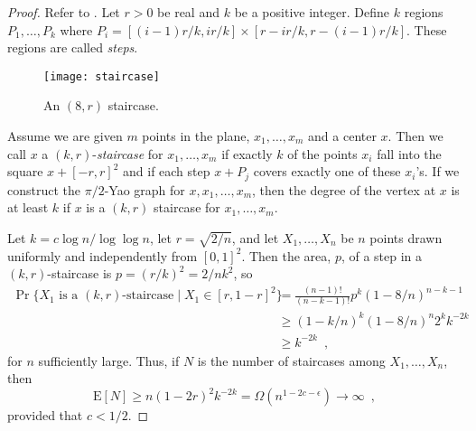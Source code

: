 \documentclass[lotsofwhite,charterfonts]{patmorin}
\newcommand{\EXP}{\mathrm{E}}
\begin{document}
\begin{proof}
Refer to .  Let $r>0$ be real and $k$ be a positive
integer.  Define $k$ regions $P_1,\ldots,P_k$ where $P_i =
[(i-1)r/k,ir/k]\times [r-ir/k,r-(i-1)r/k]$.  These regions are called
\emph{steps}. 

\begin{figure}
  \begin{center}
    \texttt{[image: staircase]}
  \end{center}
  \caption{An $(8,r)$ staircase.}
\end{figure}

Assume we are given $m$ points in the plane, $x_1,\ldots,x_m$ and a center
$x$.  Then we call $x$ a $(k,r)$-\emph{staircase} for $x_1 , \ldots , x_m$
if exactly $k$ of the points $x_i$ fall into the square $x+[-r,r]^2$ and if
each step $x+P_j$ covers exactly one of these $x_i$'s.
If we construct the $\pi/2$-Yao graph for $x,x_1,\ldots,x_m$, then the
degree of the vertex at $x$ is at least $k$ if $x$ is a $(k,r)$ staircase for
$x_1,\ldots,x_m$.

Let $k=c\log n/\log \log n$, let $r=\sqrt{2/n}$, and let $X_1,\ldots,X_n$
be $n$ points drawn uniformly and independently from $[0,1]^2$.  Then the
area, $p$, of a step in a $(k,r)$-staircase is $p=(r/k)^2=2/nk^2$, so
\[
  \begin{aligned}
     \Pr\{\mbox{$X_1$ is a $(k,r)$-staircase} \mid X_1\in[r,1-r]^2\}
        & = \frac{(n-1)!}{(n-k-1)!} p^k (1-8/n)^{n-k-1} \\
        & \ge (1-k/n)^k (1-8/n)^{n} 2^k k^{-2k} \\
        & \ge k^{-2k} \enspace ,
  \end{aligned}
\]
for $n$ sufficiently large.
Thus, if $N$ is the number of staircases among $X_1,\ldots,X_n$, then
\[
  \EXP[N]\ge n(1-2r)^2k^{-2k}
    = \Omega(n^{1-2c-\epsilon})
      \rightarrow\infty \enspace ,
\]
provided that $c < 1/2$.


\end{proof}
\end{document}
